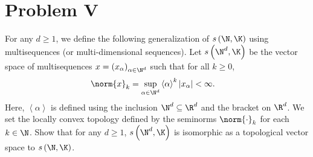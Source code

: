\documentclass[10pt]{mypackage}
\begin{document}
\section{Problem V}%
\begin{problem}
  For any $d\geq 1$, we define the following generalization of $s\left( \N,\K \right)$ using multisequences (or multi-dimensional sequences). Let $s\left( \N^d,\K \right)$ be the vector space of multisequences $x = \left( x_{\alpha} \right)_{\alpha\in \N^d}$ such that for all $k\geq 0$,
  \begin{align*}
    \norm{x}_k &= \sup_{\alpha\in \N^d}\left\langle \alpha \right\rangle^{k} \left\vert x_{\alpha} \right\vert < \infty.
  \end{align*}
  Here, $ \left\langle \alpha \right\rangle $ is defined using the inclusion $\N^d\subseteq \R^d$ and the bracket on $\R^d$. We set the locally convex topology defined by the seminorms $\norm{\cdot}_{k}$ for each $k\in \N$. Show that for any $d\geq 1$, $s\left( \N^d,\K \right)$ is isomorphic as a topological vector space to $s\left( \N,\K \right)$.
\end{problem}
\end{document}

